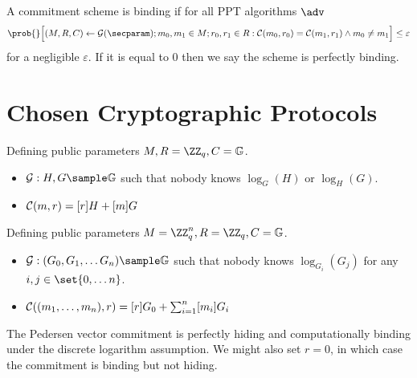 \begin{definition}
A commitment scheme is binding if for all \textsc{PPT} algorithms $\adv$
$$ \prob{} \Big[ (M, R, C) \gets \setup(\secparam); m_0, m_1 \in M; r_0, r_1 \in R: \commit(m_0, r_0) = \commit(m_1, r_1) \wedge m_0 \neq m_1 \Big] \leq \varepsilon $$
for a negligible $\varepsilon$. If it is equal to $0$ then we say the scheme is perfectly binding.
\end{definition}

\section{Chosen Cryptographic Protocols}

\begin{definition}
Defining public parameters $M, R = \ZZ_q, C = \Group$.
\begin{itemize}
    \item[] $\setup: H, G \sample \Group$ such that nobody knows $\log_G(H)$ or $\log_H(G)$.
    \item[] $\mathcal{C}(m, r) = [r]H + [m]G$  
\end{itemize}
\end{definition}

\begin{definition}
Defining public parameters $M = \ZZ_q^n, R = \ZZ_q, C = \Group$.
\begin{itemize}
    \item[] $\setup: (G_0, G_1, \dots G_n) \sample \Group$ such that nobody knows $\log_{G_i}(G_j)$ for any $i, j \in \set{0, \dots n}$.
    \item[] $\mathcal{C}((m_1, \dots, m_n), r) = [r]G_0 + \sum_{i=1}^n [m_i]G_i$
\end{itemize}
\end{definition}
The Pedersen vector commitment is perfectly hiding and computationally binding under the discrete logarithm assumption. We might also set $r = 0$, in which case the commitment is binding but not hiding.


